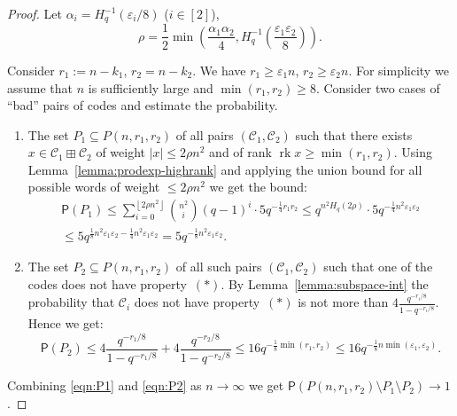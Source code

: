 \documentclass[11pt]{article}
\newcommand{\rbr}[1]{\left(#1\right)}
\newcommand{\floorbr}[1]{\left\lfloor #1\right\rfloor}
\newcommand{\ceilbr}[1]{\left\lceil #1\right\rceil}
\let\le\leqslant
\let\ge\geqslant
\newcommand{\eps}{\varepsilon}
\theoremstyle{plain}
\newtheorem{theorem}{Theorem}
\theoremstyle{definition}
\theoremstyle{remark}
\newcommand{\cC}{\mathcal{C}}
\DeclareMathOperator{\rk}{rk}
\newcommand{\PP}{\mathsf{P}}
\begin{document}
\ThMain*
\begin{proof}
    Let $\alpha_i=H_q^{-1}(\eps_i/8)$ ($i\in [2]$),  
    \begin{equation}\label{eqn:rho}
        \rho=\frac12\min\!\rbr{\frac{\alpha_1\alpha_2}{4}, H_q^{-1}\!\!\rbr{\frac{\eps_1\eps_2}{8}}}.
    \end{equation}

    Consider $r_1:=n-k_1$, $r_2=n-k_2$. We have $r_1\ge \eps_1 n$, $r_2\ge \eps_2 n$. %
    For simplicity we assume that $n$ is sufficiently large and $\min(r_1,r_2)\ge 8$.
    Consider two cases of ``bad'' pairs of codes and estimate the probability.
    \begin{enumerate}
        \item The set $P_1\subseteq P(n,r_1,r_2)$ of all pairs $(\cC_1,\cC_2)$ such that there exists $x\in \cC_1\boxplus \cC_2$  of weight $|x|\le 2\rho n^2$ and of rank $\rk x\ge\min(r_1,r_2)$. Using Lemma~\ref{lemma:prodexp-highrank} and applying the union bound for all possible words of weight $\le 2\rho n^2$ we get the bound:
        \begin{multline}\label{eqn:P1}
        \PP(P_1)
        \le \sum_{i=0}^{\floorbr{2\rho n^2}}\binom{n^2}{i}(q-1)^i\cdot 5q^{-\frac14 r_1r_2}
        \le q^{n^2 H_q(2\rho)}\cdot 5q^{-\frac14 n^2 \eps_1\eps_2} \\
        \le 5q^{\frac18 n^2 \eps_1\eps_2-\frac14 n^2 \eps_1\eps_2}=5q^{-\frac18 n^2 \eps_1\eps_2}.
        \end{multline}
        \item The set  $P_2\subseteq P(n,r_1,r_2)$ of all such pairs $(\cC_1,\cC_2)$ such that one of the codes does not have property~$(*)$. By Lemma~\ref{lemma:subspace-int} the probability that $\cC_i$ does not have property~$(*)$ is not more than $4\frac{q^{-r_i/8}}{1-q^{-r_i/8}}$. Hence we get:
        \begin{equation}\label{eqn:P2}
          \PP(P_2)\le 4\frac{q^{-r_1/8}}{1-q^{-r_1/8}}+4\frac{q^{-r_2/8}}{1-q^{-r_2/8}}\le 16 q^{-\frac18\min(r_1,r_2)}\le 16q^{-\frac18 n\min(\eps_1,\eps_2)}. 
        \end{equation}
    \end{enumerate}
    Combining \eqref{eqn:P1} and \eqref{eqn:P2} as $n\to\infty$ we get $\PP(P(n,r_1,r_2)\setminus P_1\setminus P_2)\to 1$.
    

\end{proof}
\end{document}
